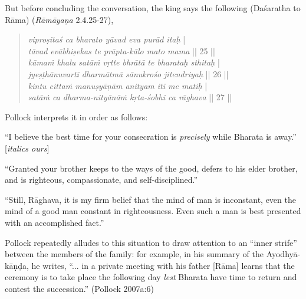 But before concluding the conversation, the king says the following (Daśaratha to Rāma) ({\sl Rāmāyaṇa} 2.4.25-27), 
\begin{quote}
{{\sl viproṣitaś ca bharato yāvad eva purād itaḥ}} |\\
{{\sl tāvad evābhiṣekas te prāpta-kālo mato mama}} || 25 ||\\
{\sl kāmaṁ khalu satāṁ vṛtte bhrātā te bharataḥ sthitaḥ} |\\
{\sl jyeṣṭhānuvartī dharmātmā sānukrośo jitendriyaḥ} || 26 ||\\
{\sl kintu cittaṁ manuṣyāṇām anityam iti me matiḥ} |\\
{\sl satāṁ ca dharma-nityānāṁ kṛta-śobhi ca rāghava} || 27 ||
\end{quote}

Pollock interprets it in order as follows:

\begin{myquote}
“I believe the best time for your consecration is {\sl precisely} while Bharata is away.” [{\sl italics ours}]
								 	 
“Granted your brother keeps to the ways of the good, defers to his elder brother, and is righteous, compassionate, and self-disciplined.”
		 
“Still, Rāghava, it is my firm belief that the mind of man is inconstant, even the mind of a good man constant in righteousness. Even such a man is best presented with an accomplished fact.”	
\end{myquote}

Pollock repeatedly alludes to this situation to draw attention to an “inner strife” between the members of the family: for example, in his summary of the Ayodhyā-kāṇḍa, he writes, “... in a private meeting with his father [Rāma] learns that the ceremony is to take place the following day {\sl lest} Bharata have time to return and contest the succession.” (Pollock 2007a:6)

